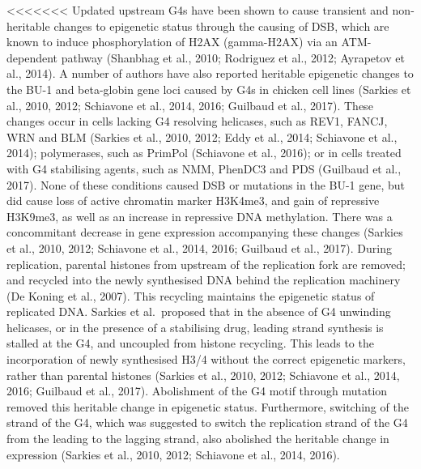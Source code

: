 \documentclass[12pt,a4paper,]{report}
\begin{document}
\textless{}\textless{}\textless{}\textless{}\textless{}\textless{}\textless{}
Updated upstream G4s have been shown to cause transient and
non-heritable changes to epigenetic status through the causing of DSB,
which are known to induce phosphorylation of H2AX (gamma-H2AX) via an
ATM-dependent pathway (Shanbhag et al., 2010; Rodriguez et al., 2012;
Ayrapetov et al., 2014). A number of authors have also reported
heritable epigenetic changes to the BU-1 and beta-globin gene loci
caused by G4s in chicken cell lines (Sarkies et al., 2010, 2012;
Schiavone et al., 2014, 2016; Guilbaud et al., 2017). These changes
occur in cells lacking G4 resolving helicases, such as REV1, FANCJ, WRN
and BLM (Sarkies et al., 2010, 2012; Eddy et al., 2014; Schiavone et
al., 2014); polymerases, such as PrimPol (Schiavone et al., 2016); or in
cells treated with G4 stabilising agents, such as NMM, PhenDC3 and PDS
(Guilbaud et al., 2017). None of these conditions caused DSB or
mutations in the BU-1 gene, but did cause loss of active chromatin
marker H3K4me3, and gain of repressive H3K9me3, as well as an increase
in repressive DNA methylation. There was a concommitant decrease in gene
expression accompanying these changes (Sarkies et al., 2010, 2012;
Schiavone et al., 2014, 2016; Guilbaud et al., 2017). During
replication, parental histones from upstream of the replication fork are
removed; and recycled into the newly synthesised DNA behind the
replication machinery (De Koning et al., 2007). This recycling maintains
the epigenetic status of replicated DNA. Sarkies et al.~proposed that in
the absence of G4 unwinding helicases, or in the presence of a
stabilising drug, leading strand synthesis is stalled at the G4, and
uncoupled from histone recycling. This leads to the incorporation of
newly synthesised H3/4 without the correct epigenetic markers, rather
than parental histones (Sarkies et al., 2010, 2012; Schiavone et al.,
2014, 2016; Guilbaud et al., 2017). Abolishment of the G4 motif through
mutation removed this heritable change in epigenetic status.
Furthermore, switching of the strand of the G4, which was suggested to
switch the replication strand of the G4 from the leading to the lagging
strand, also abolished the heritable change in expression (Sarkies et
al., 2010, 2012; Schiavone et al., 2014, 2016).

\newpage
\end{document}

